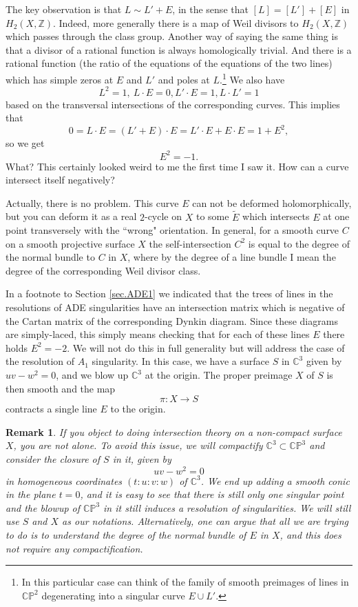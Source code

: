 \documentclass[11pt]{article}
\numberwithin{equation}{section}
\numberwithin{footnote}{section}
\newtheorem{rem}[thm]{Remark}
\newcommand{\blue}{\color{blue}}
\renewcommand{\P}{{\mathbb P}}
\newcommand{\Z}{{\mathbb Z}}
\newcommand{\C}{{\mathbb C}}
\begin{document}
\smallskip
The key observation is that $L\sim L'+E$, in the sense that $[L] = [L']+[E]$ in $H_2(X,\Z)$. Indeed, more generally there is a map of Weil divisors to $H_2(X,\Z)$ which passes through the class group. Another way of saying the same thing is that a divisor of a rational function is always homologically trivial. And there is a rational function (the ratio of the equations of the equations of the two lines)
which has simple zeros at $E$ and $L'$ and poles at $L$.\footnote{ In this particular case can think of the family of smooth preimages of  lines in $\C\P^2$ degenerating into a singular curve $E\cup L'$.}
We also have 
\begin{equation}\label{Xproduct}
L^2 = 1,~L\cdot E = 0, L'\cdot E = 1, L\cdot L' = 1
\end{equation}
based on the transversal intersections of the corresponding curves. This implies that 
$$
0 = L\cdot E = (L'+E)\cdot E = L'\cdot E + E\cdot E = 1 + E^2,
$$
so we get 
$$
E^2 = -1.
$$
What? This certainly looked weird to me the first time I saw it. How can a curve intersect itself negatively?

\smallskip
Actually, there is no problem. This curve $E$ can not be deformed holomorphically, but you can deform it as a real 
$2$-cycle on $X$ to some $\tilde E$ which intersects $E$ at one point transversely with the ``wrong" orientation. In general, for a smooth curve $C$ on a smooth projective surface $X$ the self-intersection $C^2$ is equal to the degree of the normal bundle to $C$ in $X$, where by the degree of a line bundle I mean the degree of the corresponding Weil divisor class.

\smallskip{\blue \hrule}
In a footnote to Section \ref{sec.ADE1} we indicated that the trees of lines in the resolutions of ADE singularities have an intersection matrix which is negative of the Cartan matrix of the corresponding Dynkin diagram. Since these diagrams are simply-laced, this simply means checking that for each of these lines $E$ there holds $E^2=-2$. We will not do this in full generality but will address the case of the resolution of $A_1$ singularity. In this case, we have a surface $S$ in $\C^3$ given by
$uv - w^2 = 0$, and we blow up $\C^3$ at the origin. The proper preimage $X$ of $S$ is then smooth and the map
$$
\pi:X\to S
$$
contracts a single line $E$ to the origin.

\smallskip
\begin{rem}
If you object to doing intersection theory on a non-compact surface $X$, you are not alone. To avoid this issue, we will compactify $\C^3\subset \C\P^3$ and consider the closure of $S$ in it, given by
$$
uv-w^2 =0
$$
in homogeneous coordinates $(t:u:v:w)$ of $\C^3$. We end up adding a smooth conic in the plane $t=0$, and it 
is easy to see that there is still only one singular point and the blowup of $\C\P^3$ in it still induces a resolution of singularities. We will still use $S$ and $X$ as our notations. Alternatively, one can argue that all we are trying to do is to understand the degree of the normal bundle of $E$ in $X$, and this does not require any compactification.
\end{rem}
\end{document}
